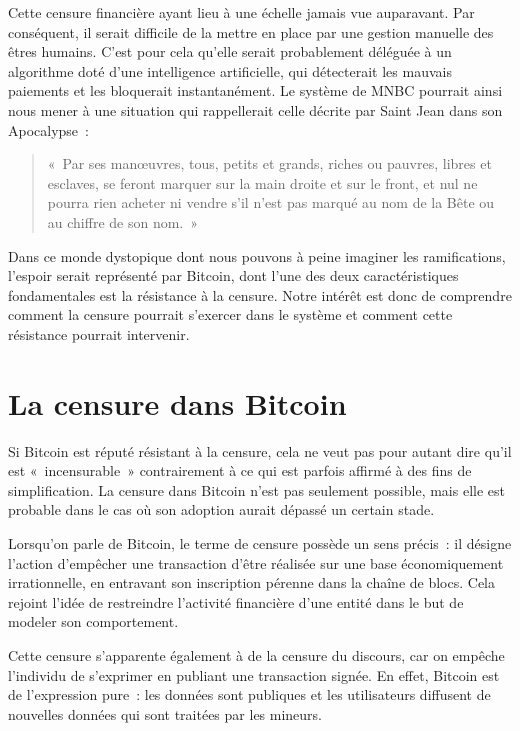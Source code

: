 Cette censure financière ayant lieu à une échelle jamais vue auparavant. Par conséquent, il serait difficile de la mettre en place par une gestion manuelle des êtres humains. C'est pour cela qu'elle serait probablement déléguée à un algorithme doté d'une intelligence artificielle, qui détecterait les mauvais paiements et les bloquerait instantanément. Le système de MNBC pourrait ainsi nous mener à une situation qui rappellerait celle décrite par Saint Jean dans son Apocalypse~:

\begin{quote}
«~Par ses manœuvres, tous, petits et grands, riches ou pauvres, libres et esclaves, se feront marquer sur la main droite et sur le front, et nul ne pourra rien acheter ni vendre s'il n'est pas marqué au nom de la Bête ou au chiffre de son nom.~»
\end{quote}

Dans ce monde dystopique dont nous pouvons à peine imaginer les ramifications, l'espoir serait représenté par Bitcoin, dont l'une des deux caractéristiques fondamentales est la résistance à la censure. Notre intérêt est donc de comprendre comment la censure pourrait s'exercer dans le système et comment cette résistance pourrait intervenir.

\section*{La censure dans Bitcoin}

Si Bitcoin est réputé résistant à la censure, cela ne veut pas pour autant dire qu'il est «~incensurable~» contrairement à ce qui est parfois affirmé à des fins de simplification. La censure dans Bitcoin n'est pas seulement possible, mais elle est probable dans le cas où son adoption aurait dépassé un certain stade.

Lorsqu'on parle de Bitcoin, le terme de censure possède un sens précis~: il désigne l'action d'empêcher une transaction d'être réalisée sur une base économiquement irrationnelle, en entravant son inscription pérenne dans la chaîne de blocs. Cela rejoint l'idée de restreindre l'activité financière d'une entité dans le but de modeler son comportement.

Cette censure s'apparente également à de la censure du discours, car on empêche l'individu de s'exprimer en publiant une transaction signée. En effet, Bitcoin est de l'expression pure~: les données sont publiques et les utilisateurs diffusent de nouvelles données qui sont traitées par les mineurs.

